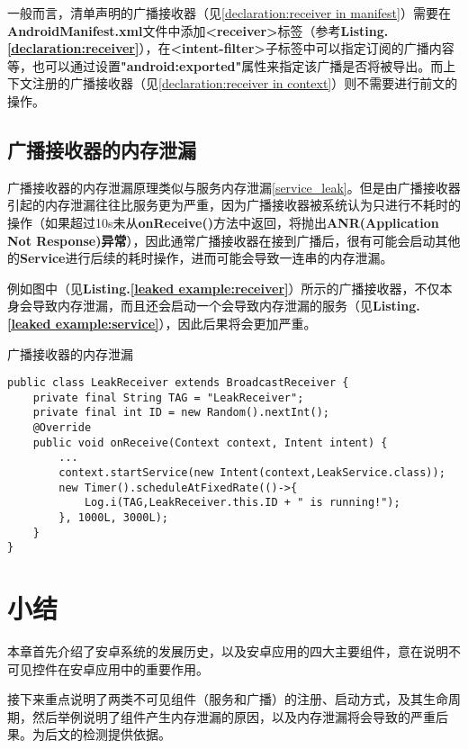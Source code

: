 一般而言，清单声明的广播接收器（见\ref{declaration:receiver in manifest}）需要在\textbf{AndroidManifest.xml}文件中添加\textbf{<receiver>}标签（参考\textbf{Listing.\textcolor{red}{\ref{declaration:receiver}}}），在\textbf{<intent-filter>}子标签中可以指定订阅的广播内容等，也可以通过设置\textbf{"android:exported"}属性来指定该广播是否将被导出。而上下文注册的广播接收器（见\ref{declaration:receiver in context}）则不需要进行前文的操作。
\subsection{广播接收器的内存泄漏}
广播接收器的内存泄漏原理类似与服务内存泄漏\ref{service_leak}。但是由广播接收器引起的内存泄漏往往比服务更为严重，因为广播接收器被系统认为只进行不耗时的操作（如果超过10s未从\textbf{onReceive()}方法中返回，将抛出\textbf{ANR(Application Not Response)异常}），因此通常广播接收器在接到广播后，很有可能会启动其他的\textbf{Service}进行后续的耗时操作，进而可能会导致一连串的内存泄漏。

例如图中（见\textbf{Listing.\textcolor{red}{\ref{leaked example:receiver}}}）所示的广播接收器，不仅本身会导致内存泄漏，而且还会启动一个会导致内存泄漏的服务（见\textbf{Listing.\textcolor{red}{\ref{leaked example:service}}}），因此后果将会更加严重。
\begin{listing}[htbp]
	\centering
	\caption{广播接收器的内存泄漏}
	\begin{verbatim}
public class LeakReceiver extends BroadcastReceiver {
	private final String TAG = "LeakReceiver";
	private final int ID = new Random().nextInt();
	@Override
	public void onReceive(Context context, Intent intent) {
		...
		context.startService(new Intent(context,LeakService.class));
		new Timer().scheduleAtFixedRate(()->{
			Log.i(TAG,LeakReceiver.this.ID + " is running!");
		}, 1000L, 3000L);
	}
}
	\end{verbatim}
	\label{leaked example:receiver}
\end{listing}

\section{小结}

本章首先介绍了安卓系统的发展历史，以及安卓应用的四大主要组件，意在说明不可见控件在安卓应用中的重要作用。

接下来重点说明了两类不可见组件（服务和广播）的注册、启动方式，及其生命周期，然后举例说明了组件产生内存泄漏的原因，以及内存泄漏将会导致的严重后果。为后文的检测提供依据。